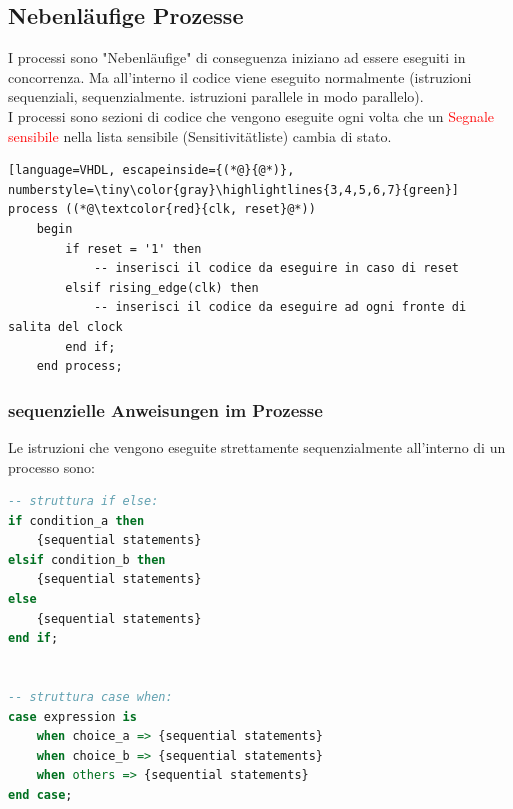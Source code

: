     \subsection{Nebenläufige Prozesse}
        I processi sono "Nebenläufige" di conseguenza iniziano ad essere eseguiti in concorrenza. Ma all'interno il codice viene eseguito normalmente (istruzioni sequenziali, sequenzialmente. istruzioni parallele in modo parallelo).\\
        I processi sono sezioni di codice che vengono eseguite ogni volta che un \textcolor{red}{Segnale sensibile} nella lista sensibile (Sensitivitätliste) cambia di stato.         %
        \begin{lstlisting}[language=VHDL, escapeinside={(*@}{@*)}, numberstyle=\tiny\color{gray}\highlightlines{3,4,5,6,7}{green}]
process ((*@\textcolor{red}{clk, reset}@*))
    begin
        if reset = '1' then
            -- inserisci il codice da eseguire in caso di reset
        elsif rising_edge(clk) then
            -- inserisci il codice da eseguire ad ogni fronte di salita del clock
        end if;
    end process;
        \end{lstlisting}
    
        \subsubsection{sequenzielle Anweisungen im Prozesse}
            Le istruzioni che vengono eseguite strettamente sequenzialmente all'interno di un processo sono:
            \begin{lstlisting}[language=VHDL]
-- struttura if else:
if condition_a then
    {sequential statements}
elsif condition_b then
    {sequential statements}
else
    {sequential statements}
end if;


-- struttura case when:
case expression is
    when choice_a => {sequential statements}
    when choice_b => {sequential statements}
    when others => {sequential statements}
end case;
            \end{lstlisting}
    
